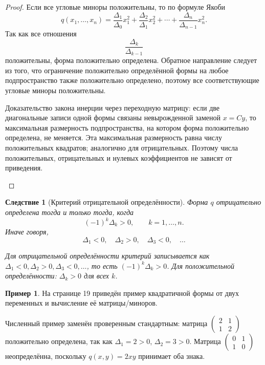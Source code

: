 \documentclass[12pt,a4paper]{article}
\theoremstyle{definition}
\newtheorem{example}[definition]{Пример}
\theoremstyle{plain}
\newtheorem{corollary}[definition]{Следствие}
\theoremstyle{remark}
\newenvironment{knowledgefix}{\begin{clarifybox}}{\end{clarifybox}}
\begin{document}
\begin{proof}
Если все угловые миноры положительны, то по формуле Якоби
\[
    q(x_1,
    \ldots,x_n)=
    \frac{\Delta_1}{\Delta_0}x_1^2+
    \frac{\Delta_2}{\Delta_1}x_2^2+
    \cdots+
    \frac{\Delta_n}{\Delta_{n-1}}x_n^2.
\]
Так как все отношения
\[
    \frac{\Delta_k}{\Delta_{k-1}}
\]
положительны, форма положительно определена.
Обратное направление следует из того, что ограничение положительно определённой формы на любое подпространство также положительно определено, поэтому все соответствующие угловые миноры положительны.
\begin{knowledgefix}
Доказательство закона инерции через переходную матрицу: если две диагональные записи одной формы связаны невырожденной заменой \(x=Cy\), то максимальная размерность подпространства, на котором форма положительно определена, не меняется. Эта максимальная размерность равна числу положительных квадратов; аналогично для отрицательных. Поэтому числа положительных, отрицательных и нулевых коэффициентов не зависят от приведения.
\end{knowledgefix}
\end{proof}

\begin{corollary}[Критерий отрицательной определённости]
Форма $q$ отрицательно определена тогда и только тогда, когда
\[
    (-1)^k\Delta_k>0,
    \qquad k=1,
    \ldots,n.
\]
Иначе говоря,
\[
    \Delta_1<0,
    \quad
    \Delta_2>0,
    \quad
    \Delta_3<0,
    \quad
    \ldots
\]
\begin{knowledgefix}
Для отрицательной определённости критерий записывается как \(\Delta_1<0,\Delta_2>0,\Delta_3<0,\ldots\), то есть \((-1)^k\Delta_k>0\). Для положительной определённости: \(\Delta_k>0\) для всех \(k\).
\end{knowledgefix}
\end{corollary}

\begin{example}
На странице 19 приведён пример квадратичной формы от двух переменных и вычисление её матрицы/миноров.
\begin{knowledgefix}
Численный пример заменён проверенным стандартным: матрица \(\begin{pmatrix}2&1\\1&2\end{pmatrix}\) положительно определена, так как \(\Delta_1=2>0\), \(\Delta_2=3>0\). Матрица \(\begin{pmatrix}0&1\\1&0\end{pmatrix}\) неопределённа, поскольку \(q(x,y)=2xy\) принимает оба знака.
\end{knowledgefix}
\end{example}
\end{document}
